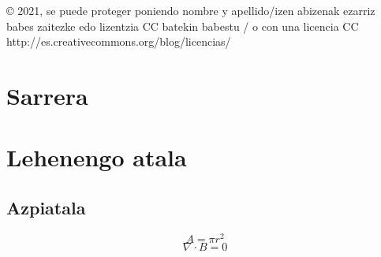 \documentclass[12pt]{article}
\begin{document}
\begin{titlepage}
\begin{center}
{    \parbox{11cm}{
         \begin{center}
    \footnotesize © 2021, se puede proteger poniendo nombre y apellido/izen abizenak ezarriz babes zaitezke edo lizentzia CC batekin babestu / o con una licencia CC
    \\
   \small http://es.creativecommons.org/blog/licencias/

        \end{center}
    }
    }
\end{center}

\hspace{-3.2cm}
\noindent{}
\end{titlepage}


\section{Sarrera}
\lipsum[1]

\section{Lehenengo atala}
\subsection{Azpiatala}
\begin{equation}
    A = \pi r^2
\end{equation}
\begin{equation}
    \nabla\cdot B = 0
\end{equation}
\end{document}
